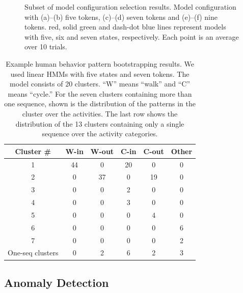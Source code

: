 \begin{figure}[t]
    \DIFaddendFL \caption[Subset of model configuration selection results.]{\small
        Subset of model configuration selection results.  Model
        configuration with (a)--(b) five tokens, (c)--(d) seven tokens 
        and (e)--(f) nine tokens. \DIFdelbeginFL {}\DIFdelendFL \DIFaddbeginFL {}\DIFaddendFL red, solid green and dash-dot blue 
        lines represent models with five, six and seven states, respectively.  
        Each point is an average over 10 trials.}
    \label{fig:batch-some-clustering-results}
\end{figure}

\begin{table}[t]
  \caption[Example human behavior pattern bootstrapping
    results.]{\small Example human behavior pattern bootstrapping
    results. We used linear HMMs with five states and seven
    tokens. The model consists of 20 clusters. ``W'' means ``walk''
    and ``C'' means ``cycle.''  For the seven clusters containing more
    than one sequence, shown is the distribution of the patterns in
    the cluster over the activities.  The last row shows the
    distribution of the 13 clusters containing only a single sequence
    over the activity categories.}
  \begin{center}
    \begin{tabular}{c|c|c|c|c|c}
      \hline
      Cluster \# & W-in & W-out & C-in & C-out & Other \\
      \hline \hline
      1 & 44 & 0 & 20 & 0 & 0 \\ \hline
      2 & 0 & 37 & 0 & 19 & 0 \\ \hline
      3 & 0 & 0 & 2 & 0 & 0 \\ \hline
      4 & 0 & 0 & 3 & 0 & 0 \\ \hline
      5 & 0 & 0 & 0 & 4 & 0 \\ \hline
      6 & 0 & 0 & 0 & 0 & 6 \\ \hline
      7 & 0 & 0 & 0 & 0 & 2 \\ \hline
      One-seq clusters & 0 & 2 & 6 & 2 & 3 \\ \hline
    \end{tabular}
  \end{center}
  \label{tab:batch-bootstrapping-results}
\end{table}

\subsection{Anomaly Detection}

